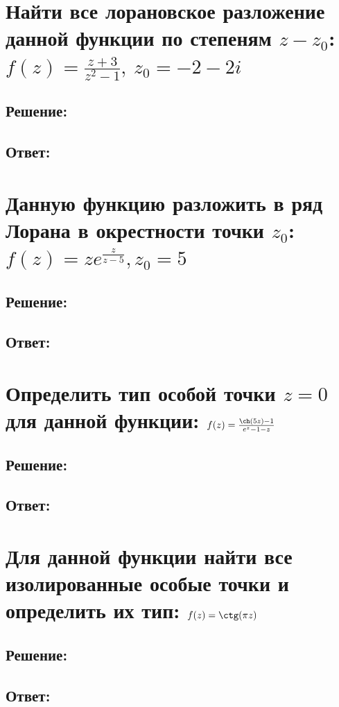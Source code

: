 \documentclass{article}
\begin{document}
	\section{Найти все лорановское разложение данной функции по степеням $z - z_0$: $f(z) = \frac{z+3}{z^2 - 1},\  z_0 = -2 -2i $}
	\subsection{Решение:}
	\subsection{Ответ:}
	
	\section{Данную функцию разложить в ряд Лорана в окрестности точки $z_0$: $f(z)=ze^{\frac{z}{z-5}}, z_0 = 5$}
	\subsection{Решение:}
	\subsection{Ответ:}
	
	\section{Определить тип особой точки $z = 0$ для данной функции: $f(z) = \frac{\ch(5z) - 1}{e^z - 1 -z}$}
	\subsection{Решение:}
	\subsection{Ответ:}
	
	
	\section{Для данной функции найти все изолированные особые точки и определить их тип: $f(z) = \ctg(\pi z)$}
	\subsection{Решение:}
	\subsection{Ответ:}
	
\end{document}
